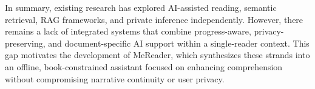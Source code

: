 In summary, existing research has explored AI-assisted reading, semantic retrieval, RAG frameworks, and private inference independently. However, there remains a lack of integrated systems that combine progress-aware, privacy-preserving, and document-specific AI support within a single-reader context. This gap motivates the development of MeReader, which synthesizes these strands into an offline, book-constrained assistant focused on enhancing comprehension without compromising narrative continuity or user privacy.